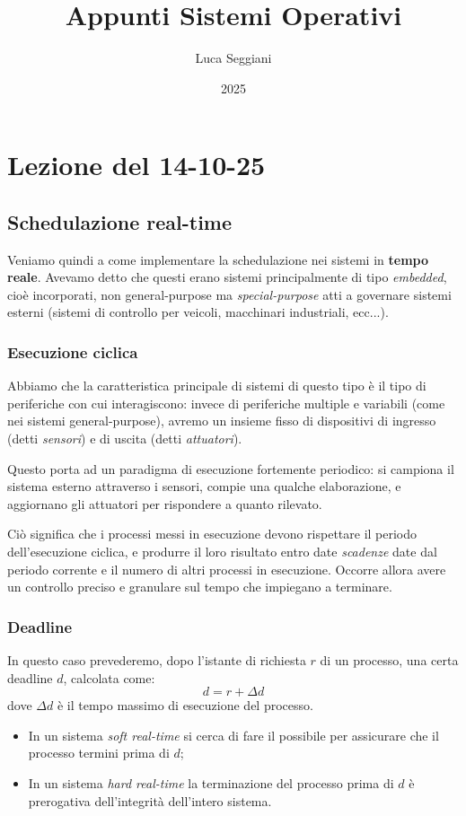 \documentclass[a4paper,11pt]{article}
\title{Appunti Sistemi Operativi}
\author{Luca Seggiani}
\date{2025}
\begin{document}
\section{Lezione del 14-10-25}

\thispagestyle{empty}
\pagestyle{fancy}

\subsection{Schedulazione real-time}
Veniamo quindi a come implementare la schedulazione nei sistemi in \textbf{tempo reale}.
Avevamo detto che questi erano sistemi principalmente di tipo \textit{embedded}, cioè incorporati, non general-purpose ma \textit{special-purpose} atti a governare sistemi esterni (sistemi di controllo per veicoli, macchinari industriali, ecc...).

\subsubsection{Esecuzione ciclica}
Abbiamo che la caratteristica principale di sistemi di questo tipo è il tipo di periferiche con cui interagiscono: invece di periferiche multiple e variabili (come nei sistemi general-purpose), avremo un insieme fisso di dispositivi di ingresso (detti \textit{sensori}) e di uscita (detti \textit{attuatori}).

Questo porta ad un paradigma di esecuzione fortemente periodico: si campiona il sistema esterno attraverso i sensori, compie una qualche elaborazione, e aggiornano gli attuatori per rispondere a quanto rilevato.

Ciò significa che i processi messi in esecuzione devono rispettare il periodo dell'esecuzione ciclica, e produrre il loro risultato entro date \textit{scadenze} date dal periodo corrente e il numero di altri processi in esecuzione.
Occorre allora avere un controllo preciso e granulare sul tempo che impiegano a terminare. 

\subsubsection{Deadline}
In questo caso prevederemo, dopo l'istante di richiesta $r$ di un processo, una certa deadline $d$, calcolata come:
$$
d = r + \Delta d
$$
dove $\Delta d$ è il tempo massimo di esecuzione del processo.
\begin{itemize}
	\item In un sistema \textit{soft real-time} si cerca di fare il possibile per assicurare che il processo termini prima di $d$;
	\item In un sistema \textit{hard real-time} la terminazione del processo prima di $d$ è prerogativa dell'integrità dell'intero sistema.
\end{itemize}
\end{document}
